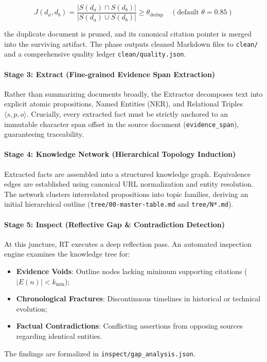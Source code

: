 \documentclass[11pt,a4paper]{article}
\begin{document}
\begin{equation}
J(d_a, d_b) = \frac{|S(d_a) \cap S(d_b)|}{|S(d_a) \cup S(d_b)|} \ge \theta_{\text{dedup}} \quad (\text{default } \theta = 0.85)
\end{equation}

the duplicate document is pruned, and its canonical citation pointer is merged into the surviving artifact. The phase outputs cleaned Markdown files to \texttt{clean/} and a comprehensive quality ledger \texttt{clean/quality.json}.

\paragraph{Stage 3: Extract (Fine-grained Evidence Span Extraction)}
Rather than summarizing documents broadly, the Extractor decomposes text into explicit atomic propositions, Named Entities (NER), and Relational Triples $\langle s, p, o \rangle$. Crucially, every extracted fact must be strictly anchored to an immutable character span offset in the source document (\texttt{evidence\_span}), guaranteeing traceability.

\paragraph{Stage 4: Knowledge Network (Hierarchical Topology Induction)}
Extracted facts are assembled into a structured knowledge graph. Equivalence edges are established using canonical URL normalization and entity resolution. The network clusters interrelated propositions into topic families, deriving an initial hierarchical outline (\texttt{tree/00-master-table.md} and \texttt{tree/N*.md}).

\paragraph{Stage 5: Inspect (Reflective Gap \& Contradiction Detection)}
At this juncture, RT executes a deep reflection pass. An automated inspection engine examines the knowledge tree for:
\begin{itemize}
    \item \textbf{Evidence Voids}: Outline nodes lacking minimum supporting citations ($|E(n)| < k_{\min}$);
    \item \textbf{Chronological Fractures}: Discontinuous timelines in historical or technical evolution;
    \item \textbf{Factual Contradictions}: Conflicting assertions from opposing sources regarding identical entities.
\end{itemize}
The findings are formalized in \texttt{inspect/gap\_analysis.json}.
\end{document}
